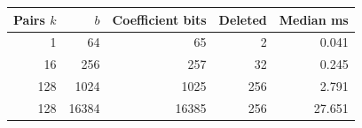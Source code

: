 \begin{tabular}{@{}rrrrr@{}}
\toprule
Pairs $k$ & $b$ & Coefficient bits & Deleted & Median ms \\
\midrule
1 & 64 & 65 & 2 & 0.041 \\
16 & 256 & 257 & 32 & 0.245 \\
128 & 1024 & 1025 & 256 & 2.791 \\
128 & 16384 & 16385 & 256 & 27.651 \\
\bottomrule
\end{tabular}
